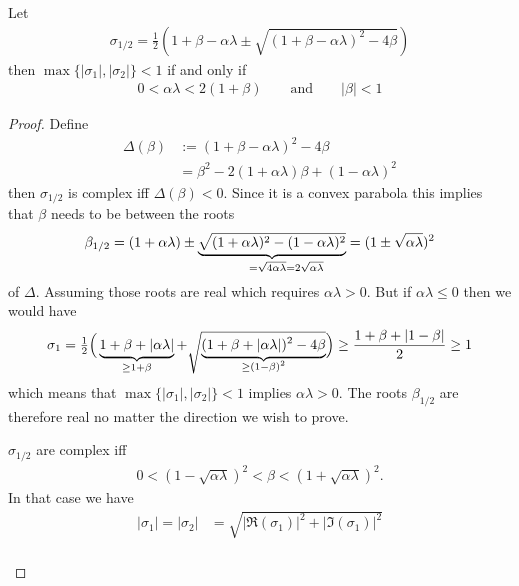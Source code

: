 \begin{lemma}
	Let
	\begin{align*}
		\sigma_{1/2}
		= \tfrac12 \left(
			1+\beta-\alpha\lambda \pm \sqrt{(1+\beta-\alpha\lambda)^2 - 4\beta}
		\right)
	\end{align*}
	then \(\max\{|\sigma_1|,|\sigma_2|\}<1\) if and only if
	\begin{align*}
		0<\alpha\lambda < 2(1+\beta) \qquad \text{and} \qquad |\beta|<1
	\end{align*}
\end{lemma}
\begin{proof}
	Define
	\begin{align*}
		\Delta(\beta)
		&:= (1+\beta-\alpha\lambda)^2 - 4\beta\\
		&= \beta^2 - 2(1+\alpha\lambda)\beta + (1-\alpha\lambda)^2
	\end{align*}
	then \(\sigma_{1/2}\) is complex iff \(\Delta(\beta)<0\). Since it is a
	convex parabola this implies that \(\beta\) needs to be between the roots
	\begin{align*}
		\beta_{1/2}
		= (1+\alpha\lambda) \pm 
		\underbrace{
			\sqrt{(1+\alpha\lambda)^2 - (1-\alpha\lambda)^2}
		}_{=\sqrt{4\alpha\lambda}=\mathrlap{2\sqrt{\alpha\lambda}}}
		= (1\pm \sqrt{\alpha\lambda})^2	
	\end{align*}
	of \(\Delta\). Assuming those roots are real which requires \(\alpha\lambda>0\).
	But if \(\alpha\lambda\le0\) then we would have
	\begin{align*}
		\sigma_1
		= \tfrac12 \Big(
			\underbrace{1+\beta+|\alpha\lambda|}_{\ge 1+\beta}
			+ \sqrt{\underbrace{(1+\beta+|\alpha\lambda|)^2 - 4\beta}_{\smash{\ge (1-\beta)^2}}}
		\Big)
		\ge \frac{1+\beta + |1-\beta|}2 \ge 1
	\end{align*}
	which means that \(\max\{|\sigma_1|,|\sigma_2|\}<1\) implies \(\alpha\lambda>0\).
	The roots \(\beta_{1/2}\) are therefore real no matter the direction we
	wish to prove.
	\begin{description}[wide, labelindent=0pt]
	\item[Complex Case:]
		\(\sigma_{1/2}\) are complex iff	
		\begin{align}\label{eq: complex case}
			0 < (1-\sqrt{\alpha\lambda})^2 < \beta < (1+\sqrt{\alpha\lambda})^2.
		\end{align}
		In that case we have
		\begin{align*}
			|\sigma_1| = |\sigma_2|
			&= \sqrt{|\Re(\sigma_1)|^2 + |\Im(\sigma_1)|^2}\\

\end{align*}
\end{description}
\end{proof}
